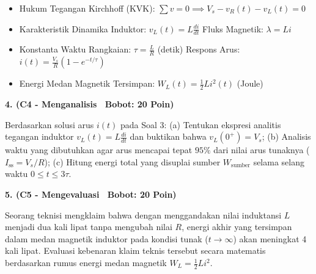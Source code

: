 \documentclass[10pt,a4paper]{article}
\begin{document}
\vfill

\begin{tcolorbox}[colback=unibblue!3,colframe=unibblue,colbacktitle=unibblue,coltitle=white,boxrule=0.6pt,arc=2pt,left=6pt,right=6pt,top=3pt,bottom=3pt,title=\textbf{\scriptsize FORMULA RUJUKAN TEKNIS \& STANDAR INDUSTRI TERKAIT}]
  \scriptsize
  \begin{itemize}[leftmargin=*, nosep]
  \item Hukum Tegangan Kirchhoff (KVK): $\sum v = 0 \implies V_s - v_R(t) - v_L(t) = 0$
  \item Karakteristik Dinamika Induktor: $v_L(t) = L \frac{di}{dt}$ \quad\textbar\quad Fluks Magnetik: $\lambda = L i$
  \item Konstanta Waktu Rangkaian: $\tau = \frac{L}{R}$ (detik) \quad\textbar\quad Respons Arus: $i(t) = \frac{V_s}{R} \left(1 - e^{-t/\tau}\right)$
  \item Energi Medan Magnetik Tersimpan: $W_L(t) = \frac{1}{2} L i^2(t)$ (Joule)
\end{itemize}
\end{tcolorbox}

\newpage

\par
\vspace{1mm}

\noindent\textbf{4. (C4 - Menganalisis \textbar\ Bobot: 20 Poin)}\par\vspace{0.8mm}
{\footnotesize Berdasarkan solusi arus $i(t)$ pada Soal 3: (a) Tentukan ekspresi analitis tegangan induktor $v_L(t) = L \frac{di}{dt}$ dan buktikan bahwa $v_L(0^+) = V_s$; (b) Analisis waktu yang dibutuhkan agar arus mencapai tepat $95\%$ dari nilai arus tunaknya ($I_{\text{ss}} = V_s/R$); (c) Hitung energi total yang disuplai sumber $W_{\text{sumber}}$ selama selang waktu $0 \le t \le 3\tau$.}\par

\vspace{3.5mm}

\noindent\textbf{5. (C5 - Mengevaluasi \textbar\ Bobot: 20 Poin)}\par\vspace{0.8mm}
{\footnotesize Seorang teknisi mengklaim bahwa dengan menggandakan nilai induktansi $L$ menjadi dua kali lipat tanpa mengubah nilai $R$, energi akhir yang tersimpan dalam medan magnetik induktor pada kondisi tunak ($t \to \infty$) akan meningkat 4 kali lipat. Evaluasi kebenaran klaim teknis tersebut secara matematis berdasarkan rumus energi medan magnetik $W_L = \frac{1}{2} L i^2$.}\par
\end{document}
